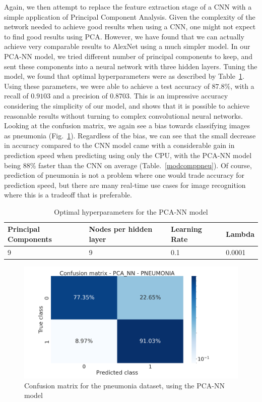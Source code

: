 \documentclass[onecolumn,10pt,cleanfoot]{asme2ej}
\begin{document}
Again, we then attempt to replace the feature extraction stage of a CNN with a simple application of Principal Component Analysis. Given the complexity of the network needed to achieve good results when using a CNN, one might not expect to find good results using PCA. However, we have found that we can actually achieve very comparable results to AlexNet using a much simpler model. In our PCA-NN model, we tried different number of principal components to keep, and sent these components into a neural network with three hidden layers. Tuning the model, we found that optimal hyperparameters were as described by Table~\ref{pcanntable}. Using these parameters, we were able to achieve a test accuracy of $87.8\%$, with a recall of $0.9103$ and a precision of $0.8703$. This is an impressive accuracy considering the simplicity of our model, and shows that it is possible to achieve reasonable results without turning to complex convolutional neural networks. Looking at the confusion matrix, we again see a bias towards classifying images as pneumonia (Fig.~\ref{conf_pca_nn_pneu}). Regardless of the bias, we can see that the small decrease in accuracy compared to the CNN model came with a considerable gain in prediction speed when predicting using only the CPU, with the PCA-NN model being $88\%$ faster than the CNN on average (Table.~\ref{modcomppneu}). Of course, prediction of pneumonia is not a problem where one would trade accuracy for prediction speed, but there are many real-time use cases for image recognition where this is a tradeoff that is preferable.

\begin{table}[H]
\caption{Optimal hyperparameters for the PCA-NN model}
\begin{center}
\label{pcanntable}
\begin{tabular}{| l | l | l | l |}
\hline
Principal Components & Nodes per hidden layer & Learning Rate & Lambda \\
\hline
9 & 9 & 0.1 & 0.0001 \\
\hline
\end{tabular}
\end{center}
\end{table}

\begin{figure}[H]
\centerline{\includegraphics[width=5in]{figure/conf_pca_nn_pneu.png}}
\caption{Confusion matrix for the pneumonia dataset, using the PCA-NN model}
\label{conf_pca_nn_pneu}
\end{figure}
\end{document}
